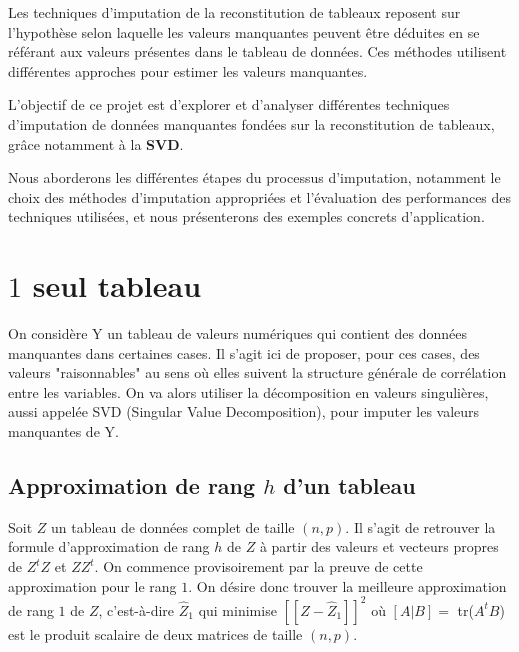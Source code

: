 \documentclass[12pt, openany, fleqn, french]{article}
\begin{document}
    Les techniques d'imputation de la reconstitution de tableaux reposent sur l'hypothèse selon laquelle les valeurs manquantes peuvent être déduites en se référant aux valeurs présentes dans le tableau de données. Ces méthodes utilisent différentes approches pour estimer les valeurs manquantes.

    L'objectif de ce projet est d'explorer et d'analyser différentes techniques d'imputation de données manquantes fondées sur la reconstitution de tableaux, grâce notamment à la \textbf{SVD}. 

    Nous aborderons les différentes étapes du processus d'imputation, notamment le choix des méthodes d'imputation appropriées et l'évaluation des performances des techniques utilisées, et nous présenterons des exemples concrets d'application.

\newpage
\section{$1$ seul tableau}

On considère Y un tableau de valeurs numériques qui contient des données manquantes dans certaines cases. Il s'agit ici de proposer, pour ces cases, des valeurs "raisonnables" au sens où elles suivent la structure générale de corrélation entre les variables.
On va alors utiliser la décomposition en valeurs singulières, aussi appelée SVD (Singular Value Decomposition), pour imputer les valeurs manquantes de Y. 

  \subsection{Approximation de rang $h$ d'un tableau}

    Soit $Z$ un tableau de données complet de taille $(n,p)$. Il s'agit de retrouver la formule d'approximation de rang $h$ de $Z$ à partir des valeurs et vecteurs propres de $Z^{t}Z$ et $ZZ^{t}$. On commence provisoirement par la preuve de cette approximation pour le rang $1$. On désire donc trouver la meilleure approximation de rang $1$ de $Z$, c'est-à-dire $\hat{Z}_1$ qui minimise $[\![Z-\hat{Z}_1]\!]^{2}$ où $[A|B]=$ tr($A^{t}B$) est le produit scalaire de deux matrices de taille $(n,p)$. \\
\end{document}
